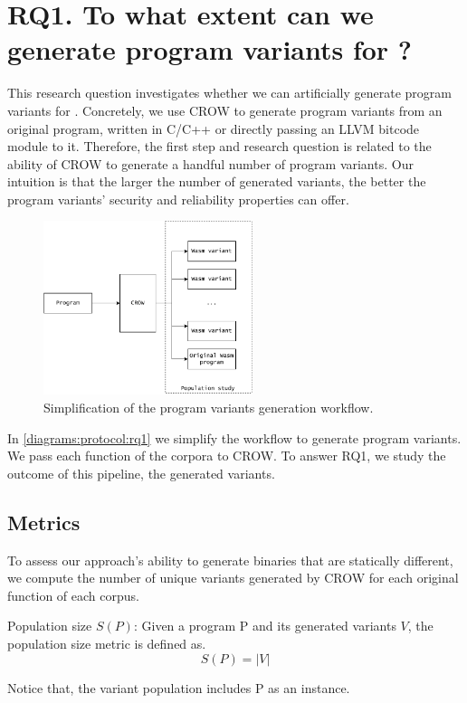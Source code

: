 
\section{RQ1. To what extent can we generate program variants for \wasm?}
\label{rq1}
This research question investigates whether we can artificially generate program variants for \wasm. Concretely, we use CROW to generate program variants from an original program, written in C/C++ or directly passing an LLVM bitcode module to it. Therefore, the first step and research question is related to the ability of CROW to generate a handful number of program variants. Our intuition is that the larger the number of generated variants, the better the program variants' security and reliability properties can offer.



\begin{figure}[h]
    \centering
    \includegraphics[height=2in]{diagrams/Rq1.pdf}
    \caption{Simplification of the program variants generation workflow.}
    \label{diagrams:protocol:rq1}
\end{figure}


In \autoref{diagrams:protocol:rq1} we simplify the workflow to generate \wasm program variants. We pass each function of the corpora to CROW. To answer RQ1, we study the outcome of this pipeline, the generated variants. 

\subsection{Metrics}

To assess our approach's ability to generate \wasm binaries that are statically different, we compute the number of unique variants generated by CROW for each original function of each corpus. 



\begin{metric}{Population size $S(P)$:}\label{metric:md5sum}
    Given a program P and its generated variants $V$, the population size metric is defined as.\\
    $$
        S(P)=|V|
    $$

    Notice that, the variant population includes P as an instance.
\end{metric}

